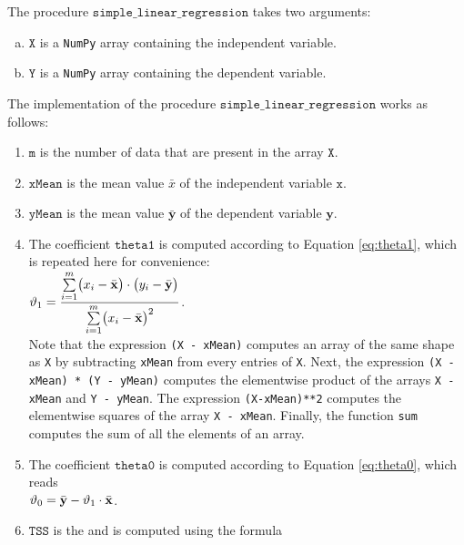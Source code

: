 \noindent
The procedure $\mathtt{simple\_linear\_regression}$ takes two arguments:
\begin{enumerate}[(a)]
\item $\mathtt{X}$ is a \texttt{NumPy} array containing the independent variable.
\item $\mathtt{Y}$ is a \texttt{NumPy} array containing the dependent variable.
\end{enumerate}
The implementation of the procedure $\mathtt{simple\_linear\_regression}$ works as follows:
\begin{enumerate}
\item $\mathtt{m}$ is the number of data that are present in the array $\texttt{X}.$
\item $\mathtt{xMean}$ is the mean value $\bar{x}$ of the independent variable $\mathtt{x}$.
\item $\mathtt{yMean}$ is the mean value $\bar{\mathbf{y}}$ of the dependent variable $\mathbf{y}$. 
\item The coefficient $\mathtt{theta1}$ is computed according to Equation \ref{eq:theta1}, which is repeated
      here for convenience:
      \\[0.2cm]
      \hspace*{1.3cm}
      $\displaystyle\vartheta_1 = \frac{\sum\limits_{i=1}^m \bigl(x_i - \bar{\mathbf{x}}\bigr) \cdot \bigl(y_i - \bar{\mathbf{y}}\bigr)}{
                        \sum\limits_{i=1}^m \bigl(x_i - \bar{\mathbf{x}}\bigr)^2}  
      $.
      \\[0.2cm]
      Note that the expression \texttt{(X - xMean)} computes an array of the same shape as \texttt{X}
      by subtracting \texttt{xMean} from every entries of \texttt{X}.
      Next, the expression \texttt{(X - xMean) * (Y - yMean)} computes the elementwise product
      of the arrays \texttt{X - xMean} and \texttt{Y - yMean}.
      The expression \texttt{(X-xMean)**2} computes the elementwise squares of the array \texttt{X - xMean}.
      Finally, the function \texttt{sum} computes the sum of all the elements of an array.
\item The coefficient $\mathtt{theta0}$ is computed according to Equation \ref{eq:theta0}, which reads
      \\[0.2cm]
      \hspace*{1.3cm}
      $\displaystyle\vartheta_0 = \bar{\mathbf{y}} - \vartheta_1 \cdot \bar{\mathbf{x}}$.
\item $\mathtt{TSS}$ is the  and is computed using the formula
      \\[0.2cm]

\end{enumerate}
